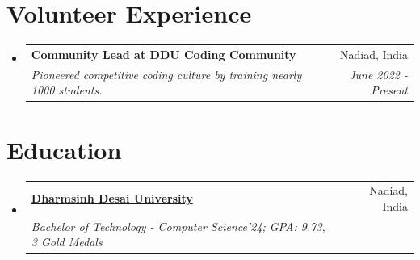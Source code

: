 \documentclass[a4paper,10pt]{article}
\makeatletter
\newcommand{\resumeSubheading}[4]{
  \vspace{-1pt}\item
    \begin{tabular*}{0.97\textwidth}{l@{\extracolsep{\fill}}r}
      \textbf{#1} & #2 \\
      \textit{#3} & \textit{#4} \\
    \end{tabular*}\vspace{-5pt}
}
\newcommand{\resumeSubHeadingListStart}{\begin{itemize}[leftmargin=*]}
\newcommand{\resumeSubHeadingListEnd}{\end{itemize}}
\makeatother
\begin{document}
\section{Volunteer Experience}
  \resumeSubHeadingListStart
	\resumeSubheading
    {Community Lead at DDU Coding Community}{Nadiad, India}
    {Pioneered competitive coding culture by training nearly 1000 students.}{June 2022 - Present}
\vspace{2pt}
\resumeSubHeadingListEnd

\section{Education}
  \resumeSubHeadingListStart
    \resumeSubheading
      {\href{https://www.ddu.ac.in/}{Dharmsinh Desai University}}{Nadiad, India}
      {Bachelor of Technology - Computer Science'24;  GPA: 9.73, 3 Gold Medals}{}
    \resumeSubHeadingListEnd	    
\end{document}
